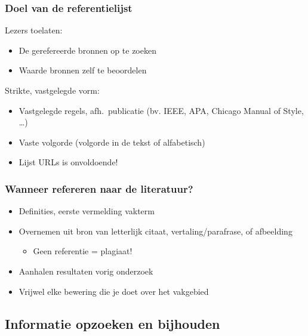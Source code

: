 \documentclass[aspectratio=169]{beamer}
\begin{document}
\begin{frame}
  \frametitle{Doel van de referentielijst}

  Lezers toelaten:

  \begin{itemize}
    \item De gerefereerde bronnen op te zoeken
    \item Waarde bronnen zelf te beoordelen
  \end{itemize}

  \pause

  Strikte, vastgelegde vorm:

  \begin{itemize}
    \item Vastgelegde regels, afh.~publicatie (bv. IEEE, APA, Chicago Manual of Style, \ldots)
    \item Vaste volgorde (volgorde in de tekst of alfabetisch)
    \item Lijst URLs is onvoldoende!
  \end{itemize}

  \pause

\end{frame}

\begin{frame}
  \frametitle{Wanneer refereren naar de literatuur?}

  \begin{itemize}
    \item Definities, eerste vermelding vakterm
    \item Overnemen uit bron van letterlijk citaat, vertaling/parafrase, of afbeelding
      \begin{itemize}
        \item Geen referentie = \alert{plagiaat!}
      \end{itemize}
    \item Aanhalen resultaten vorig onderzoek
    \item Vrijwel elke bewering die je doet over het vakgebied
  \end{itemize}

  \vfill

\end{frame}

\subsection{Informatie opzoeken en bijhouden}
\end{document}

